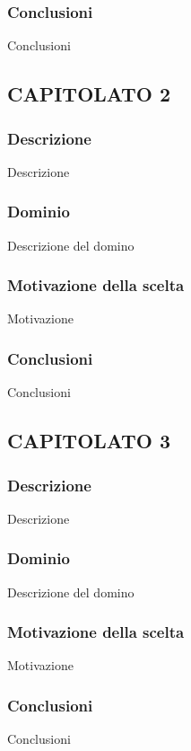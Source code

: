 \subsubsection{Conclusioni}
Conclusioni
\subsection{CAPITOLATO 2}

\subsubsection{Descrizione}
Descrizione
\subsubsection{Dominio}
Descrizione del domino

\subsubsection{Motivazione della scelta}
Motivazione
\subsubsection{Conclusioni}
Conclusioni

\subsection{CAPITOLATO 3}

\subsubsection{Descrizione}
Descrizione
\subsubsection{Dominio}
Descrizione del domino

\subsubsection{Motivazione della scelta}
Motivazione
\subsubsection{Conclusioni}
Conclusioni